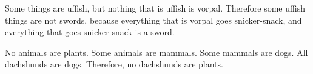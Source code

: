 \begin{exercises}
\item Some things are uffish, but nothing that is uffish is vorpal. Therefore some uffish things are not swords, because everything that is vorpal goes snicker-snack, and everything that goes snicker-snack is a sword.






\item No animals are plants. Some animals are mammals. Some mammals are dogs. All dachshunds are dogs. Therefore, no dachshunds are plants.





\end{exercises}
